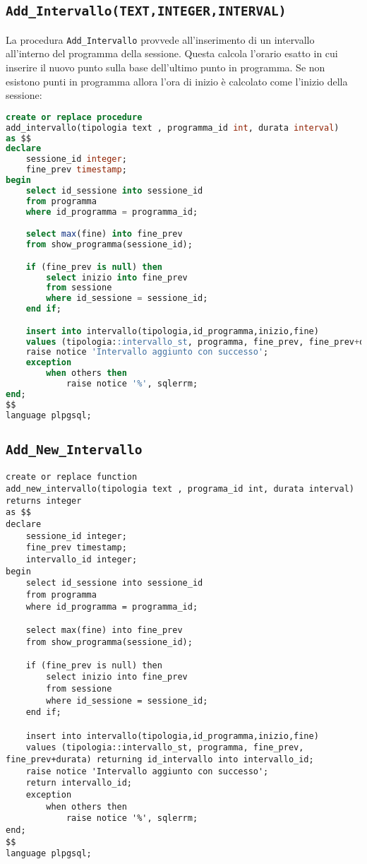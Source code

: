 \subsection{\texttt{Add\_Intervallo(TEXT,INTEGER,INTERVAL)}}
La procedura \texttt{Add\_Intervallo} provvede all'inserimento di un intervallo all'interno del programma della sessione. Questa calcola l'orario esatto in cui inserire il nuovo punto sulla base dell'ultimo punto in programma. Se non esistono punti in programma allora l'ora di inizio è calcolato come l'inizio della sessione:
\begin{lstlisting}[language=SQL,style=mystyle]
create or replace procedure 
add_intervallo(tipologia text , programma_id int, durata interval)
as $$
declare
    sessione_id integer;
    fine_prev timestamp;
begin
    select id_sessione into sessione_id
    from programma
    where id_programma = programma_id;

    select max(fine) into fine_prev
    from show_programma(sessione_id);

    if (fine_prev is null) then
        select inizio into fine_prev
        from sessione
        where id_sessione = sessione_id;
    end if;

    insert into intervallo(tipologia,id_programma,inizio,fine)
    values (tipologia::intervallo_st, programma, fine_prev, fine_prev+durata);
    raise notice 'Intervallo aggiunto con successo';
    exception
        when others then
            raise notice '%', sqlerrm;
end;
$$ 
language plpgsql;
\end{lstlisting}
\subsection{\texttt{Add\_New\_Intervallo}}
\begin{lstlisting}
create or replace function 
add_new_intervallo(tipologia text , programa_id int, durata interval)
returns integer
as $$
declare
    sessione_id integer;
    fine_prev timestamp;
    intervallo_id integer;
begin
    select id_sessione into sessione_id
    from programma
    where id_programma = programma_id;

    select max(fine) into fine_prev
    from show_programma(sessione_id);

    if (fine_prev is null) then
        select inizio into fine_prev
        from sessione
        where id_sessione = sessione_id;
    end if;

    insert into intervallo(tipologia,id_programma,inizio,fine)
    values (tipologia::intervallo_st, programma, fine_prev, fine_prev+durata) returning id_intervallo into intervallo_id;
    raise notice 'Intervallo aggiunto con successo';
    return intervallo_id;
    exception
        when others then
            raise notice '%', sqlerrm;
end;
$$ 
language plpgsql;
\end{lstlisting}
